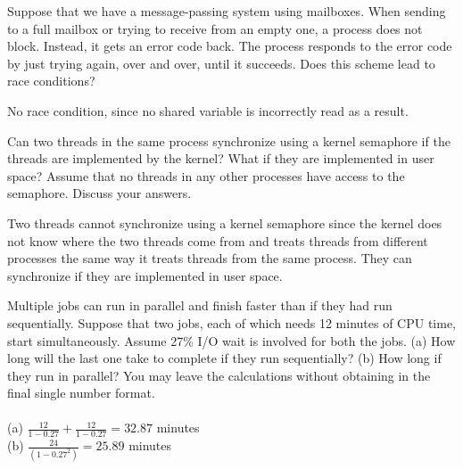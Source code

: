 \documentclass[12pt]{article}
\newenvironment{problem}[2][Problem]{\begin{trivlist}
\item[\hskip \labelsep {\bfseries #1}\hskip \labelsep {\bfseries #2.}]}{\end{trivlist}}
\begin{document}
\begin{problem}{5}
    Suppose that we have a message-passing system using mailboxes. When sending to a full
    mailbox or trying to receive from an empty one, a process does not block. Instead, it gets an error code
    back. The process responds to the error code by just trying again, over and over, until it succeeds. Does this
    scheme lead to race conditions?

    No race condition, since no shared variable is incorrectly read as a result.
\end{problem}

\begin{problem}{6}
    Can two threads in the same process synchronize using a kernel semaphore if the threads are
implemented by the kernel? What if they are implemented in user space? Assume that no threads in any
other processes have access to the semaphore. Discuss your answers.

Two threads cannot synchronize using a kernel semaphore since the kernel does not know where the two threads come from and treats threads from different processes the same way it treats threads from the same process.
They can synchronize if they are implemented in user space.
\end{problem}

\begin{problem}{7}
    Multiple jobs can run in parallel and finish faster than if they had run sequentially.
    Suppose that two jobs, each of which needs 12 minutes of CPU time, start simultaneously. Assume
    27\% I/O wait is involved for both the jobs. (a) How long will the last one take to complete if they
    run sequentially? (b) How long if they run in parallel? You may leave the calculations without
    obtaining in the final single number format. \\\\
    (a) $\frac{12}{1-0.27} + \frac{12}{1-0.27} = 32.87$ minutes\\
    (b) $\frac{24}{(1-0.27^2)} = 25.89$ minutes

\end{problem}

 
\end{document}
